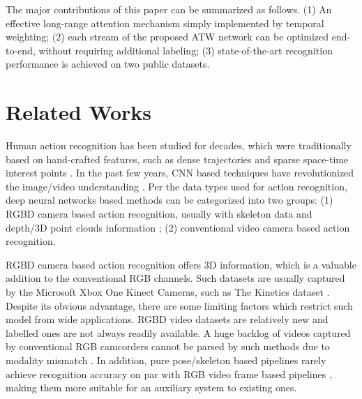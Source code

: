 \documentclass[runningheads,a4paper]{llncs}
\begin{document}
The major contributions of this paper can be summarized as follows. (1) An effective long-range attention mechanism simply implemented by temporal weighting; (2) each stream of the proposed ATW network can be optimized end-to-end, without requiring additional labeling; (3) state-of-the-art recognition performance is achieved on two public datasets.


\section{Related Works}
Human action recognition has been studied for decades, which were traditionally based on hand-crafted features, such as dense trajectories \cite{wang2013action,wang2011action} and sparse space-time interest points \cite{laptev2005space}. In the past few years, CNN based techniques have revolutionized the image/video understanding \cite{ji20133d,simonyan2014two,karpathy2014large,yue2015beyond,wang2016temporal,carreira2017quo,donahue2015long,feichtenhofer2016convolutional,s17102421,s17061341}. Per the data types used for action recognition, deep neural networks based methods can be categorized into two groups: (1) RGBD camera based action recognition, usually with skeleton data and depth/3D point clouds information \cite{cheron2015p,wang2012mining,du2015hierarchical}; (2) conventional video camera based action recognition.


RGBD camera based action recognition offers 3D information, which is a valuable addition to the conventional RGB channels.
Such datasets are usually captured by the Microsoft Xbox One Kinect Cameras, such as The Kinetics dataset \cite{cheron2015p}.
Despite its obvious advantage, there are some limiting factors which restrict such model from wide applications. RGBD video
datasets are relatively new and labelled ones are not always readily available. A huge backlog of videos captured by
conventional RGB camcorders cannot be parsed by such methods due to modality mismatch \cite{zhang2015multi}. In addition, pure pose/skeleton based pipelines rarely achieve
recognition accuracy on par with RGB video frame based pipelines \cite{zhang2015can,zhang2015auxiliary}, making them more suitable for an auxiliary system to
existing ones.
\end{document}
